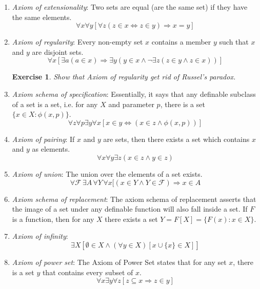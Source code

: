 \documentclass[11pt,a5paper]{article}
\newtheorem{exercise}{Exercise}
\begin{document}
\begin{enumerate}
	\item \emph{Axiom of extensionality}: 
Two sets are equal (are the same set) if they have the same elements.
\[\forall x \forall y [ \forall z (z \in x \Leftrightarrow z \in y) \Rightarrow x = y]\]

	\item \emph{Axiom of regularity}:
Every non-empty set $x$ contains a member $y$ such that $x$ and $y$ are disjoint sets.
\[\forall x [ \exists a ( a \in x) \Rightarrow \exists y ( y \in x \land \lnot \exists z (z \in y \land z \in x))]\]
\begin{exercise}
Show that Axiom of regularity get rid of Russel's paradox.
\end{exercise}
	\item \emph{Axiom schema of specification}:
Essentially, it says that any definable subclass of a set is a set, i.e. for any $X$ and parameter $p$, there is a set $\{x \in X : \phi(x,p)\}$.
\[\forall z \forall p \exists y \forall x [x \in y \Leftrightarrow ( x \in z \land \phi(x,p) )]\]

	\item \emph{Axiom of pairing}:
If $x$ and $y$ are sets, then there exists a set which contains $x$ and $y$ as elements.
\[\forall x \forall y \exists z (x \in z \land y \in z)\]
	
	\item \emph{Axiom of union}:
The union over the elements of a set exists.
\[\forall \mathcal{F} \,\exists A \, \forall Y\, \forall x [(x \in Y \land Y \in \mathcal{F}) \Rightarrow x \in A\]
	
	\item \emph{Axiom schema of replacement}:
The axiom schema of replacement asserts that the image of a set under any definable function will also fall inside a set.
If $F$ is a function, then for any $X$ there exists a set $Y=F[X]=\{F(x):x \in X\}$.
	
	\item \emph{Axiom of infinity}:
	\[\exists X \left [\emptyset \in X \land (\forall y \in X )[x \cup \{x\}  \in X]\right ]\]
	
	\item \emph{Axiom of power set}:
The Axiom of Power Set states that for any set $x$, there is a set $y$ that contains every subset of $x$.
\[\forall x \exists y \forall z [z \subseteq x \Rightarrow z \in y]\]
	
\end{enumerate}
\end{document}
